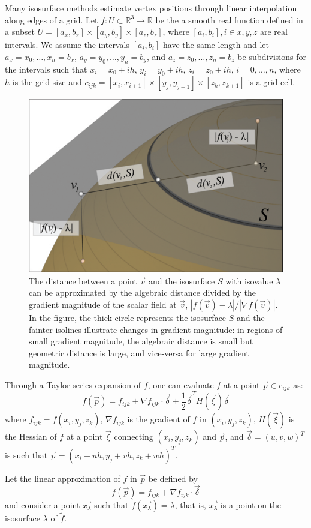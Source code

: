 Many isosurface methods estimate vertex positions through linear
interpolation along edges of a grid.
Let $f:U\subset\mathbb{R}^3 \rightarrow \mathbb{R}$ be the a smooth 
real function defined in a 
subset $U=[a_x,b_x]\times[a_y,b_y]\times[a_z,b_z]$, where $[a_i,b_i], i \in {x,y,z}$ 
are real intervals.
We assume the intervals $[a_i,b_i]$ have the same length and 
let $a_x=x_0,\ldots,x_n=b_x$, $a_y=y_0,\ldots,y_n=b_y$, and
$a_z=z_0,\ldots,z_n=b_z$ be subdivisions for the intervals such that
$x_i = x_0+ih$, $y_i = y_0+ih$, $z_i = z_0+ih,\, i=0,\ldots,n$, 
where $h$ is the grid size and 
$c_{ijk}=[x_i,x_{i+1}]\times[y_j,y_{j+1}]\times[z_k,z_{k+1}]$
is a grid cell. 
\begin{figure}[h]
\centering
\includegraphics[width=.5\linewidth]{chapter2/figures/algebraic.pdf}
\caption{The distance between a point $\vec{v}$ and the isosurface $S$
  with isovalue $\lambda$ can be approximated by the algebraic
  distance divided by the gradient magnitude of the scalar field at $\vec{v}$,
  $|f(\vec{v})-\lambda| / |\nabla f(\vec{v})|$. In the figure, the
  thick circle represents the isosurface $S$ and the fainter isolines
  illustrate changes in gradient magnitude: in regions of small
  gradient magnitude, the algebraic distance is small but geometric
  distance is large, and vice-versa for large gradient magnitude.}
\label{fig:algebraic-distance}
\end{figure}
Through a Taylor series expansion of $f$, one can evaluate $f$ 
at a point $\vec{p}\in c_{ijk}$ as:
\begin{equation}
f(\vec{p}) = f_{ijk} + \nabla f_{ijk}\cdot \vec{\delta} + \frac{1}{2}\vec{\delta}^T H(\vec{\xi}) \vec{\delta}
\label{eq:taylor}
\end{equation}
\noindent where $f_{ijk}=f(x_i,y_j,z_k)$, $\nabla f_{ijk}$ is the gradient 
of $f$ in $(x_i,y_j,z_k)$,
$H(\vec{\xi})$ is the Hessian of $f$ at a point $\vec{\xi}$ 
connecting $(x_i,y_j,z_k)$ and $\vec{p}$, 
and $\vec{\delta} = (u,v,w)^T$ is such that $\vec{p} = (x_i+uh,y_j+vh,z_k+wh)^T$.

Let the linear approximation of $f$ in $\vec{p}$ be defined by
\begin{equation}
\tilde{f}(\vec{p}) = f_{ijk} + \nabla f_{ijk}\cdot \vec{\delta}
\label{eq:linear}
\end{equation}
\noindent and consider a point $\vec{x_\lambda}$  such that $\tilde{f}(\vec{x_\lambda}) = \lambda$, that is,  
$\vec{x_\lambda}$ is a point on the isosurface $\lambda$ of $\tilde{f}$.

